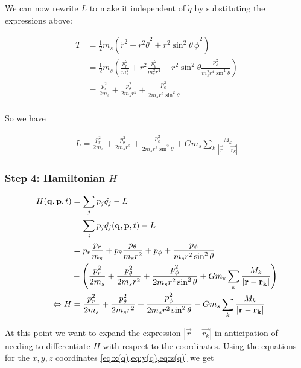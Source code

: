We can now rewrite \(L\) to make it independent of \(\dot{q}\) by substituting the expressions above:

\begin{align}
    T &= \frac{1}{2} m_s (\dot{r}^2 + r^2\dot{\theta}^2 + r^2\sin^2{\theta}\,\dot{\phi}^2) \\
    &= \frac{1}{2} m_s \left(\frac{p_r^2}{m_s^2} + r^2\frac{p_\theta^2}{m_s^2 r^4} + r^2\sin^2{\theta}\frac{p_\phi^2}{m_s^2 r^4 \sin^4{\theta}} \right) \\
    &= \frac{p_r^2}{2 m_s} + \frac{p_\theta^2}{2 m_s r^2} + \frac{p_\phi^2}{2 m_s r^2 \sin^2{\theta}} \\
\end{align}

So we have

\begin{align}
    L = \frac{p_r^2}{2 m_s} + \frac{p_\theta^2}{2 m_s r^2} + \frac{p_\phi^2}{2 m_s r^2 \sin^2{\theta}} + G m_s \sum\limits_{k} \frac{M_k}{\left| \vec{r} - \vec{r_k} \right|}
\end{align}

\subsubsection{Step 4: Hamiltonian \(H\)}
\begin{align}
    H(\vec{q}, \vec{p}, t) &= \sum\limits_{j}p_j \dot{q_j} - L \\
    &= \sum\limits_{j}p_j \dot{q_j}(\vec{q}, \vec{p}, t) - L \\
    &= p_r \frac{p_r}{m_s} + p_\theta \frac{p_\theta}{m_s r^2} + p_\phi + \frac{p_\phi}{m_s r^2 \sin^2{\theta}} \notag \\
    &- \left( \frac{p_r^2}{2 m_s} + \frac{p_\theta^2}{2 m_s r^2} + \frac{p_\phi^2}{2 m_s r^2 \sin^2{\theta}} + G m_s \sum\limits_{k} \frac{M_k}{\left| \vec{r} - \vec{r_k} \right|} \right) \\
    \Leftrightarrow H &= \frac{p_r^2}{2 m_s} + \frac{p_\theta^2}{2 m_s r^2} + \frac{p_\phi^2}{2 m_s r^2 \sin^2{\theta}} - G m_s \sum\limits_{k} \frac{M_k}{\left| \vec{r} - \vec{r_k} \right|}
\end{align}

At this point we want to expand the expression \(\left| \vec{r} - \vec{r_k} \right|\) in anticipation of needing to differentiate \(H\) with respect to the coordinates. Using the equations for the \(x, y, z\) coordinates \cref{eq:x(q),eq:y(q),eq:z(q)} we get

